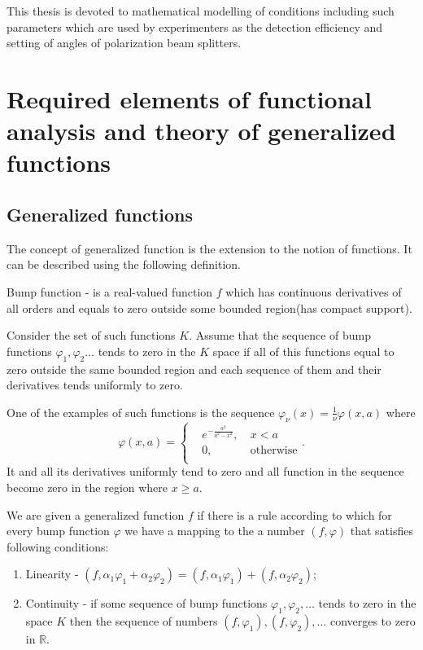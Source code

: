 \documentclass[11pt]{article}
\newenvironment{definition}[1][Definition]{\begin{trivlist}
\item[\hskip \labelsep {\bfseries #1}]}{\end{trivlist}}
\begin{document}
This thesis is devoted to mathematical modelling of conditions
including such parameters which are used by experimenters as the detection efficiency and setting of angles of polarization beam splitters.

\section{Required elements of functional analysis and theory of generalized functions}
\subsection{Generalized functions}
The concept of generalized function is the extension to the notion of  functions. It can be described using the following definition.

\begin{definition}
Bump function - is a real-valued function $f$ which has continuous derivatives of all orders and equals to zero outside some bounded region(has compact support).
\end{definition}
Consider the set of such functions $K$. Assume that the sequence of bump functions $\varphi_1,\varphi_2\ldots$ tends to zero in the $K$ space if all of this functions equal to zero outside the same bounded region and each sequence of them and their derivatives tends uniformly to zero.

One of the examples of such functions is the sequence $\varphi_\nu(x) = \frac{1}{\nu}\varphi(x, a)$ where 
\[
\varphi(x, a) = \left\{
\begin{aligned}
&e^{-\frac{a^2}{a^2 - x^2}},&\ x<a\\
&0,&\ \mbox{otherwise}\\
\end{aligned} \right. .
\]
It and all its derivatives uniformly tend to zero and all function in the sequence become zero in the region where $x \geq a$.

\begin{definition}
We are given a generalized function $f$ if there is a rule according to which for every bump function $\varphi$ we have a mapping to the a number $(f, \varphi)$ that satisfies following conditions:
\begin{enumerate}
\item Linearity - $(f, \alpha_1\varphi_1 + \alpha_2\varphi_2) = (f, \alpha_1\varphi_1) + (f, \alpha_2\varphi_2)$;
\item Continuity - if some sequence of bump functions $\varphi_1,\varphi_2,\ldots$ tends to zero in the space $K$ then the sequence of numbers $(f, \varphi_1), (f, \varphi_2), \ldots$ converges to zero in $\mathbb{R}$.
\end{enumerate}
\end{definition}
\end{document}
